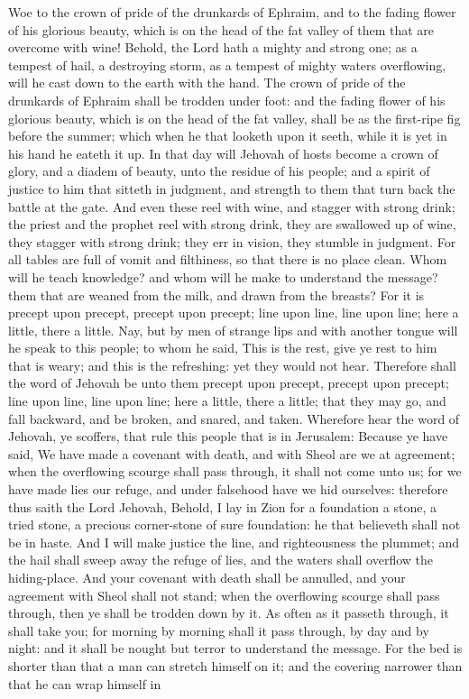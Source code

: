 Woe to the crown of pride of the drunkards of Ephraim, and to the fading flower of his glorious beauty, which is on the head of the fat valley of them that are overcome with wine! Behold, the Lord hath a mighty and strong one; as a tempest of hail, a destroying storm, as a tempest of mighty waters overflowing, will he cast down to the earth with the hand. The crown of pride of the drunkards of Ephraim shall be trodden under foot: and the fading flower of his glorious beauty, which is on the head of the fat valley, shall be as the first-ripe fig before the summer; which when he that looketh upon it seeth, while it is yet in his hand he eateth it up. In that day will Jehovah of hosts become a crown of glory, and a diadem of beauty, unto the residue of his people; and a spirit of justice to him that sitteth in judgment, and strength to them that turn back the battle at the gate.  And even these reel with wine, and stagger with strong drink; the priest and the prophet reel with strong drink, they are swallowed up of wine, they stagger with strong drink; they err in vision, they stumble in judgment. For all tables are full of vomit and filthiness, so that there is no place clean.  Whom will he teach knowledge? and whom will he make to understand the message? them that are weaned from the milk, and drawn from the breasts? For it is precept upon precept, precept upon precept; line upon line, line upon line; here a little, there a little.  Nay, but by men of strange lips and with another tongue will he speak to this people; to whom he said, This is the rest, give ye rest to him that is weary; and this is the refreshing: yet they would not hear. Therefore shall the word of Jehovah be unto them precept upon precept, precept upon precept; line upon line, line upon line; here a little, there a little; that they may go, and fall backward, and be broken, and snared, and taken.  Wherefore hear the word of Jehovah, ye scoffers, that rule this people that is in Jerusalem: Because ye have said, We have made a covenant with death, and with Sheol are we at agreement; when the overflowing scourge shall pass through, it shall not come unto us; for we have made lies our refuge, and under falsehood have we hid ourselves: therefore thus saith the Lord Jehovah, Behold, I lay in Zion for a foundation a stone, a tried stone, a precious corner-stone of sure foundation: he that believeth shall not be in haste. And I will make justice the line, and righteousness the plummet; and the hail shall sweep away the refuge of lies, and the waters shall overflow the hiding-place. And your covenant with death shall be annulled, and your agreement with Sheol shall not stand; when the overflowing scourge shall pass through, then ye shall be trodden down by it. As often as it passeth through, it shall take you; for morning by morning shall it pass through, by day and by night: and it shall be nought but terror to understand the message. For the bed is shorter than that a man can stretch himself on it; and the covering narrower than that he can wrap himself in 